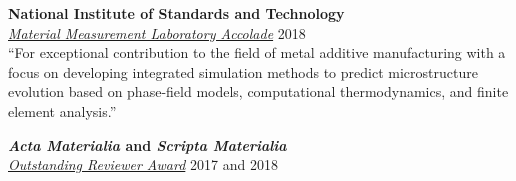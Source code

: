 \documentclass[margin]{res}
\begin{document}
\begin{resume}
{\bf National Institute of Standards and Technology}\\[0.25\baselineskip]
\href{https://www.nist.gov/mml/mml-accolades/2018-accolades/technical-excellence-2018}{\textit{Material Measurement Laboratory Accolade}} \hfill{}2018\\
``For exceptional contribution to the field of metal additive manufacturing with a focus on developing integrated simulation methods to predict microstructure evolution based on phase-field models, computational thermodynamics, and finite element analysis.''


{\bf \textit{Acta Materialia} and \textit{Scripta Materialia}}\\[0.25\baselineskip]
\href{https://doi.org/10.1016/j.actamat.2019.04.059}{\textit{Outstanding Reviewer Award}} \hfill{}2017 and 2018


\end{resume}
\end{document}
